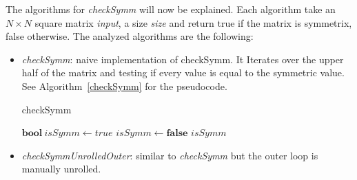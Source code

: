 \documentclass[conference]{IEEEtran}
\begin{document}
The algorithms for \textit{checkSymm} will now be explained. Each algorithm take an $N \times N$ square matrix \textit{input}, a size \textit{size} and return true if the matrix is symmetrix, false otherwise.
The analyzed algorithms are the following:
\begin{itemize}
\item \textit{checkSymm}: naive implementation of checkSymm. It Iterates over the upper half of the matrix and testing if every value is equal to the symmetric value. See Algorithm~\ref{checkSymm} for the pseudocode.

  \begin{algorithm}
    \caption{checkSymm}\label{checkSymm}
    \begin{algorithmic}[1]
        \State $\textbf{bool}\ isSymm \gets true$
            	\State $isSymm \gets \textbf{false}$
            	\EndIf
        	\EndFor
        \EndFor
        \State \Return $isSymm$
    \end{algorithmic}
  \end{algorithm}

  
\item \textit{checkSymmUnrolledOuter}: similar to \textit{checkSymm} but the outer loop is manually unrolled.

\iffalse
  \begin{algorithm}
    \caption{checkSymmUnrolledOuter}\label{checkSymmUnrolledOuter}
    \begin{algorithmic}[1]
      \Procedure{checkSymmUnrolledOuter}{$Matrix input, int size$}
        \State $isSymm = true$
        \For{\textit{i} \textbf{ in } \textit{0..size-1}}
            \For{\textit{j} \textbf{ in } \textit{i..size-1}}
            \If $input[i][j] != input[j][i]$
            \State $isSymm = false$
            \EndIf
            \If $input[i+1][j] != input[j][i+1]$
            \State $isSymm = false$
                        \EndIf
            \If $input[i+2][j] != input[j][i+2]$
            \State $isSymm = false$
                        \EndIf
            \If $input[i+3][j] != input[j][i+3]$
            \State $isSymm = false$
                        \EndIf
        \EndFor
        \EndFor
        \Return $isSymm$
      \EndProcedure
    \end{algorithmic}
  \end{algorithm}
\fi
  

\end{itemize}
\end{document}

